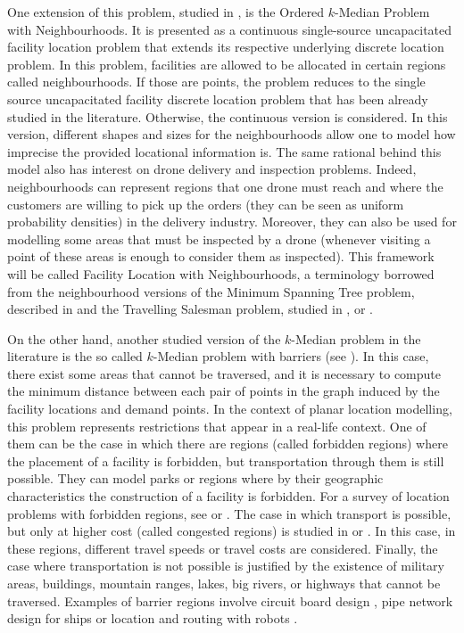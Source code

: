 \documentclass[a4paper,  review, authoryear, 1p.]{elsarticle}
\newcommand{\JP}[1]{{\color{blue}#1}}
\newcommand{\CV}[1]{{\color{blue}#1}}
\begin{document}
	\CV{One extension of this problem, studied in \cite{blanco2019}, is the Ordered $k$-Median Problem with Neighbourhoods. It} is presented as a continuous single-source uncapacitated facility location problem that extends its respective underlying discrete location problem. In this problem, facilities are allowed to be allocated in certain regions called neighbourhoods. If those are points, the problem reduces to the single source uncapacitated facility discrete location problem that has been already studied in the literature. Otherwise, the continuous version is considered. In this version, different shapes and sizes for the neighbourhoods allow one to model how imprecise the provided locational information is. \JP{The same rational behind this model also has interest on drone delivery and inspection problems. Indeed, neighbourhoods can represent regions that one drone must reach and where the customers are willing to pick up the orders (they can be seen as uniform probability densities) in the delivery industry. Moreover, they can also be used for modelling some areas that must be inspected by a drone (whenever visiting a point of these areas is enough to consider them as inspected).} This framework will be called Facility Location with Neighbourhoods, a terminology borrowed from the neighbourhood versions of the Minimum Spanning Tree problem, described in \citet{blanco2017} and the Travelling Salesman problem, studied in \citet{gentilini2013}, \citet{yuan2017} or \citet{puerto2022a}.
	
	\JP{On the other hand, another studied version of the $k$-Median problem in the literature is the so called $k$-Median problem with barriers (see \citet{klamroth2002}). In this case, there exist some areas that cannot be traversed, and it is necessary to compute the minimum distance between each pair of points in the graph induced by the facility locations and demand points. In the context of planar location modelling, this problem represents restrictions that appear in a real-life context. One of them can be the case in which there are regions (called forbidden regions) where the placement of a facility is forbidden, but transportation through them is still possible. They can model parks or regions where by their geographic characteristics the construction of a facility is forbidden. For a survey of location problems with forbidden regions, see \cite{hamacher1995} or \cite{nickel1995}. The case in which transport is possible, but only at higher cost (called congested regions) is studied in \cite{butt1996} or \cite{mitchell1991}. In this case, in these regions, different travel speeds or travel costs are considered. Finally, the case where transportation is not possible is justified by the existence of military areas, buildings, mountain ranges, lakes, big rivers, or highways that cannot be traversed. Examples of barrier regions involve circuit board design \citep{lapaugh1980}, pipe network design for ships \citep{wangdahl1974, blanco2022} or location and routing with robots \citep{lozano-perez1979}. }
	
\end{document}
